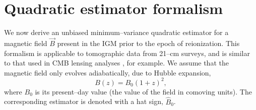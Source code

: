 \documentclass[aps,prd,twocolumn,floatfix,showpacs,superscriptaddress,nofootinbib]{revtex4-1}
\newcommand{\beq}{\begin{equation}}
\newcommand{\eeq}{\end{equation}}
\begin{document}
\section{Quadratic estimator formalism}
\label{sec:estimators}

We now derive an unbiased minimum--variance quadratic estimator for a magnetic field $\vec B$ present in the IGM prior to the epoch of reionization. This formalism is applicable to tomographic data from 21--cm surveys, and is similar to that used in CMB lensing analyses \cite{2003PhRvD..67h3002O}, for example. We assume that the magnetic field only evolves adiabatically, due to Hubble expansion, 
\beq
B(z) = B_0(1+z)^2,
\label{eq:B0}
\eeq
where $B_0$ is its present--day value (the value of the field in comoving units). The corresponding estimator is denoted with a hat sign, $\widehat B_0$. 
\end{document}
